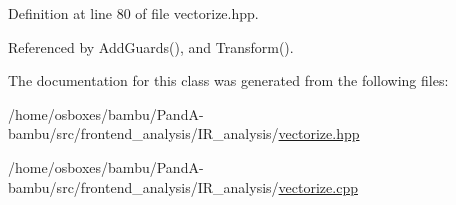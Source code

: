 Definition at line 80 of file vectorize.\+hpp.



Referenced by Add\+Guards(), and Transform().



The documentation for this class was generated from the following files\+:\begin{DoxyCompactItemize}
\item 
/home/osboxes/bambu/\+Pand\+A-\/bambu/src/frontend\+\_\+analysis/\+I\+R\+\_\+analysis/\hyperlink{vectorize_8hpp}{vectorize.\+hpp}\item 
/home/osboxes/bambu/\+Pand\+A-\/bambu/src/frontend\+\_\+analysis/\+I\+R\+\_\+analysis/\hyperlink{vectorize_8cpp}{vectorize.\+cpp}\end{DoxyCompactItemize}
